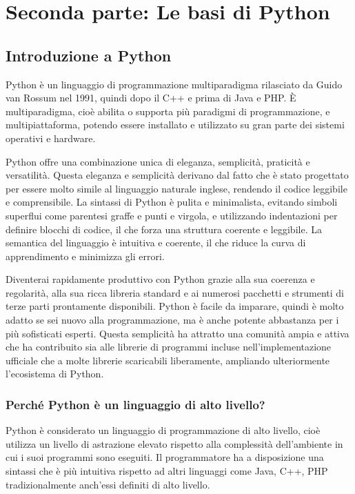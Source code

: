 \documentclass[
  letterpaper,
]{scrbook}
\begin{document}
\part{Seconda parte: Le basi di Python}

\chapter{Introduzione a Python}\label{introduzione-a-python}

Python è un linguaggio di programmazione multiparadigma rilasciato da
Guido van Rossum nel 1991, quindi dopo il C++ e prima di Java e PHP. È
multiparadigma, cioè abilita o supporta più paradigmi di programmazione,
e multipiattaforma, potendo essere installato e utilizzato su gran parte
dei sistemi operativi e hardware.

Python offre una combinazione unica di eleganza, semplicità, praticità e
versatilità. Questa eleganza e semplicità derivano dal fatto che è stato
progettato per essere molto simile al linguaggio naturale inglese,
rendendo il codice leggibile e comprensibile. La sintassi di Python è
pulita e minimalista, evitando simboli superflui come parentesi graffe e
punti e virgola, e utilizzando indentazioni per definire blocchi di
codice, il che forza una struttura coerente e leggibile. La semantica
del linguaggio è intuitiva e coerente, il che riduce la curva di
apprendimento e minimizza gli errori.

Diventerai rapidamente produttivo con Python grazie alla sua coerenza e
regolarità, alla sua ricca libreria standard e ai numerosi pacchetti e
strumenti di terze parti prontamente disponibili. Python è facile da
imparare, quindi è molto adatto se sei nuovo alla programmazione, ma è
anche potente abbastanza per i più sofisticati esperti. Questa
semplicità ha attratto una comunità ampia e attiva che ha contribuito
sia alle librerie di programmi incluse nell'implementazione ufficiale
che a molte librerie scaricabili liberamente, ampliando ulteriormente
l'ecosistema di Python.

\section{Perché Python è un linguaggio di alto
livello?}\label{perchuxe9-python-uxe8-un-linguaggio-di-alto-livello}

Python è considerato un linguaggio di programmazione di alto livello,
cioè utilizza un livello di astrazione elevato rispetto alla complessità
dell'ambiente in cui i suoi programmi sono eseguiti. Il programmatore ha
a disposizione una sintassi che è più intuitiva rispetto ad altri
linguaggi come Java, C++, PHP tradizionalmente anch'essi definiti di
alto livello.
\end{document}
